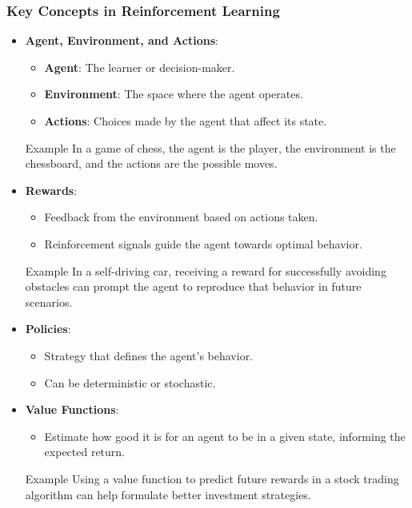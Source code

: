 \documentclass[aspectratio=169]{beamer}
\begin{document}
\begin{frame}[fragile]
    \frametitle{Key Concepts in Reinforcement Learning}
    \begin{itemize}
        \item \textbf{Agent, Environment, and Actions}:
        \begin{itemize}
            \item \textbf{Agent}: The learner or decision-maker.
            \item \textbf{Environment}: The space where the agent operates.
            \item \textbf{Actions}: Choices made by the agent that affect its state.
        \end{itemize}
        \begin{block}{Example}
            In a game of chess, the agent is the player, the environment is the chessboard, and the actions are the possible moves.
        \end{block}
        
        \item \textbf{Rewards}:
        \begin{itemize}
            \item Feedback from the environment based on actions taken.
            \item Reinforcement signals guide the agent towards optimal behavior.
        \end{itemize}
        \begin{block}{Example}
            In a self-driving car, receiving a reward for successfully avoiding obstacles can prompt the agent to reproduce that behavior in future scenarios.
        \end{block}
        
        \item \textbf{Policies}:
        \begin{itemize}
            \item Strategy that defines the agent's behavior.
            \item Can be deterministic or stochastic.
        \end{itemize}

        \item \textbf{Value Functions}:
        \begin{itemize}
            \item Estimate how good it is for an agent to be in a given state, informing the expected return.
        \end{itemize}
        \begin{block}{Example}
            Using a value function to predict future rewards in a stock trading algorithm can help formulate better investment strategies.
        \end{block}
    \end{itemize}
\end{frame}
\end{document}
